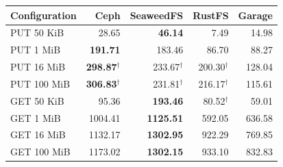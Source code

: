 \begin{tabular}{lrrrr}
\toprule
Configuration & Ceph & SeaweedFS & RustFS & Garage \\
\midrule
PUT 50 KiB & 28.65 & \textbf{46.14} & 7.49 & 14.98 \\
PUT 1 MiB & \textbf{191.71} & 183.46 & 86.70 & 88.27 \\
PUT 16 MiB & \textbf{298.87}$^{\dagger}$ & 233.67$^{\dagger}$ & 200.30$^{\dagger}$ & 128.04 \\
PUT 100 MiB & \textbf{306.83}$^{\dagger}$ & 231.81$^{\dagger}$ & 216.17$^{\dagger}$ & 115.61 \\
\midrule
GET 50 KiB & 95.36 & \textbf{193.46} & 80.52$^{\dagger}$ & 59.01 \\
GET 1 MiB & 1004.41 & \textbf{1125.51} & 592.05 & 636.58 \\
GET 16 MiB & 1132.17 & \textbf{1302.95} & 922.29 & 769.85 \\
GET 100 MiB & 1173.02 & \textbf{1302.15} & 933.10 & 832.83 \\
\bottomrule
\end{tabular}
